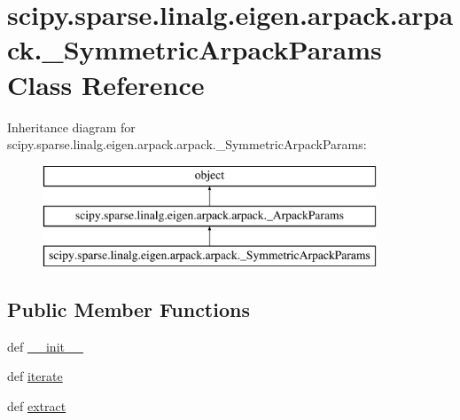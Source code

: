 \hypertarget{classscipy_1_1sparse_1_1linalg_1_1eigen_1_1arpack_1_1arpack_1_1__SymmetricArpackParams}{}\section{scipy.\+sparse.\+linalg.\+eigen.\+arpack.\+arpack.\+\_\+\+Symmetric\+Arpack\+Params Class Reference}
\label{classscipy_1_1sparse_1_1linalg_1_1eigen_1_1arpack_1_1arpack_1_1__SymmetricArpackParams}
Inheritance diagram for scipy.\+sparse.\+linalg.\+eigen.\+arpack.\+arpack.\+\_\+\+Symmetric\+Arpack\+Params\+:\begin{figure}[H]
\begin{center}
\leavevmode
\includegraphics[height=3.000000cm]{classscipy_1_1sparse_1_1linalg_1_1eigen_1_1arpack_1_1arpack_1_1__SymmetricArpackParams}
\end{center}
\end{figure}
\subsection*{Public Member Functions}
\begin{DoxyCompactItemize}
\item 
def \hyperlink{classscipy_1_1sparse_1_1linalg_1_1eigen_1_1arpack_1_1arpack_1_1__SymmetricArpackParams_a3dad33ffae2be3ba6761720a68b0026f}{\+\_\+\+\_\+init\+\_\+\+\_\+}
\item 
def \hyperlink{classscipy_1_1sparse_1_1linalg_1_1eigen_1_1arpack_1_1arpack_1_1__SymmetricArpackParams_aa8f46137945bce3981490a6ea5097efc}{iterate}
\item 
def \hyperlink{classscipy_1_1sparse_1_1linalg_1_1eigen_1_1arpack_1_1arpack_1_1__SymmetricArpackParams_a93d3c65246db23c5b096be7869bd2d00}{extract}
\end{DoxyCompactItemize}
